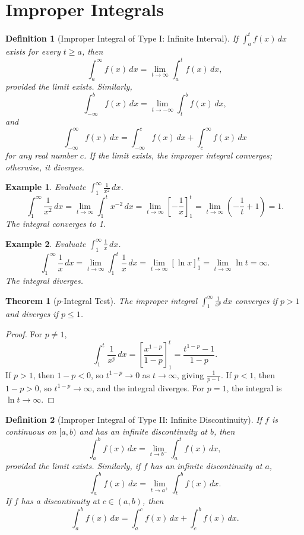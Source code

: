 \documentclass[11pt,a4paper]{article}
\newtheorem{example}{Example}
\newtheorem{theorem}{Theorem}
\newtheorem{definition}{Definition}
\begin{document}
\section{Improper Integrals}
\begin{definition}[Improper Integral of Type I: Infinite Interval]
If $\displaystyle \int_a^t f(x) \, dx$ exists for every $t \geq a$, then
\[
\int_a^{\infty} f(x) \, dx = \lim_{t \to \infty} \int_a^t f(x) \, dx,
\]
provided the limit exists. Similarly,
\[
\int_{-\infty}^b f(x) \, dx = \lim_{t \to -\infty} \int_t^b f(x) \, dx,
\]
and
\[
\int_{-\infty}^{\infty} f(x) \, dx = \int_{-\infty}^c f(x) \, dx + \int_c^{\infty} f(x) \, dx
\]
for any real number $c$. If the limit exists, the improper integral \textit{converges}; otherwise, it \textit{diverges}.
\end{definition}
\begin{example}
Evaluate $\displaystyle \int_1^{\infty} \frac{1}{x^2} \, dx$.
\[
\int_1^{\infty} \frac{1}{x^2} \, dx = \lim_{t \to \infty} \int_1^t x^{-2} \, dx = \lim_{t \to \infty} \left[ -\frac{1}{x} \right]_1^t = \lim_{t \to \infty} \left( -\frac{1}{t} + 1 \right) = 1.
\]
The integral converges to 1.
\end{example}
\begin{example}
Evaluate $\displaystyle \int_1^{\infty} \frac{1}{x} \, dx$.
\[
\int_1^{\infty} \frac{1}{x} \, dx = \lim_{t \to \infty} \int_1^t \frac{1}{x} \, dx = \lim_{t \to \infty} [\ln x]_1^t = \lim_{t \to \infty} \ln t = \infty.
\]
The integral diverges.
\end{example}
\begin{theorem}[$p$-Integral Test]
The improper integral $\displaystyle \int_1^{\infty} \frac{1}{x^p} \, dx$ converges if $p > 1$ and diverges if $p \leq 1$.
\end{theorem}
\begin{proof}
For $p \neq 1$,
\[
\int_1^t \frac{1}{x^p} \, dx = \left[ \frac{x^{1-p}}{1-p} \right]_1^t = \frac{t^{1-p} - 1}{1-p}.
\]
If $p > 1$, then $1 - p < 0$, so $t^{1-p} \to 0$ as $t \to \infty$, giving $\frac{1}{p-1}$. If $p < 1$, then $1 - p > 0$, so $t^{1-p} \to \infty$, and the integral diverges. For $p = 1$, the integral is $\ln t \to \infty$.
\end{proof}
\begin{definition}[Improper Integral of Type II: Infinite Discontinuity]
If $f$ is continuous on $[a, b)$ and has an infinite discontinuity at $b$, then
\[
\int_a^b f(x) \, dx = \lim_{t \to b^-} \int_a^t f(x) \, dx,
\]
provided the limit exists. Similarly, if $f$ has an infinite discontinuity at $a$,
\[
\int_a^b f(x) \, dx = \lim_{t \to a^+} \int_t^b f(x) \, dx.
\]
If $f$ has a discontinuity at $c \in (a, b)$, then
\[
\int_a^b f(x) \, dx = \int_a^c f(x) \, dx + \int_c^b f(x) \, dx.
\]
\end{definition}
\end{document}
